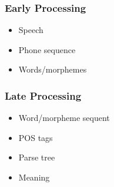     \subsubsection{Early Processing}

      \begin{itemize}
        \item Speech
        \item Phone sequence
        \item Words/morphemes
      \end{itemize}

    \subsubsection{Late Processing}

      \begin{itemize}
        \item Word/morpheme sequent
        \item POS tags
        \item Parse tree
        \item Meaning
      \end{itemize}